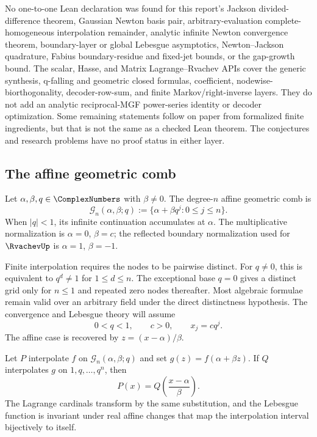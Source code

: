 No one-to-one Lean declaration was found for this report's Jackson
divided-difference theorem, Gaussian Newton basis pair, arbitrary-evaluation
complete-homogeneous interpolation remainder, analytic infinite Newton
convergence theorem, boundary-layer or global Lebesgue asymptotics,
Newton--Jackson quadrature, Fabius boundary-residue and fixed-jet bounds,
or the gap-growth bound.  The scalar, Hasse, and Matrix Lagrange--Rvachev APIs
cover the generic synthesis, q-falling and geometric closed formulas,
coefficient, nodewise-biorthogonality, decoder-row-sum, and finite
Markov/right-inverse layers.  They do not add an analytic reciprocal-MGF
power-series identity or decoder optimization.  Some remaining statements
follow on paper from formalized finite ingredients, but
that is not the same as a checked Lean theorem.  The conjectures and research
problems have no proof status in either layer.

\subsection{The affine geometric comb}

\begin{definition}
Let $\alpha,\beta,q\in\ComplexNumbers$ with $\beta\ne0$.  The degree-$n$ affine geometric
comb is
\[
 \mathcal G_n(\alpha,\beta;q)
 :=\{\alpha+\beta q^j:0\le j\le n\}.
\]
When $|q|<1$, its infinite continuation accumulates at $\alpha$.  The
multiplicative normalization is $\alpha=0$, $\beta=c$; the reflected
boundary normalization used for $\RvachevUp$ is $\alpha=1$, $\beta=-1$.
\end{definition}

Finite interpolation requires the nodes to be pairwise distinct.  For
$q\ne0$, this is equivalent to $q^d\ne1$ for $1\le d\le n$.  The exceptional
base $q=0$ gives a distinct grid only for $n\le1$ and repeated zero nodes
thereafter.  Most algebraic formulae remain valid over an arbitrary field
under the direct distinctness hypothesis.  The convergence and Lebesgue
theory will assume
\begin{equation}
 0<q<1,
 \qquad c>0,
 \qquad x_j=cq^j.
 \label{gq:eq:real-normalization}
\end{equation}
The affine case is recovered by $z=(x-\alpha)/\beta$.

\begin{proposition}
Let $P$ interpolate $f$ on $\mathcal G_n(\alpha,\beta;q)$ and set
$g(z)=f(\alpha+\beta z)$.  If $Q$ interpolates $g$ on
$1,q,\ldots,q^n$, then
\[
 P(x)=Q\!\left(\frac{x-\alpha}{\beta}\right).
\]
The Lagrange cardinals transform by the same substitution, and the Lebesgue
function is invariant under real affine changes that map the interpolation
interval bijectively to itself.
\end{proposition}

